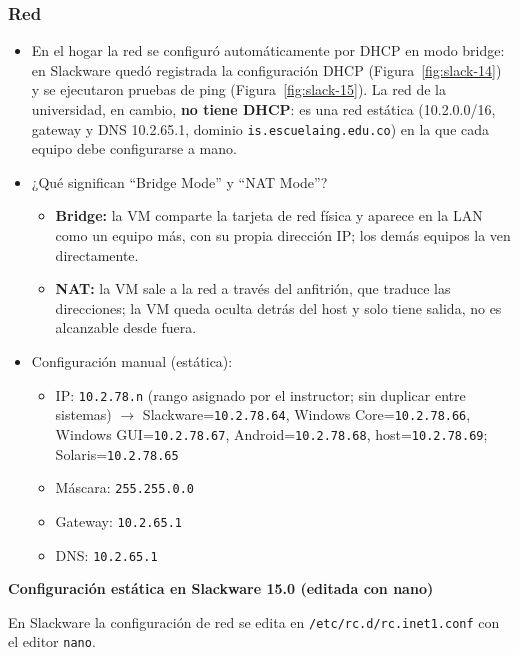 \documentclass[11pt,a4paper]{report}
\begin{document}
\subsubsection{Red}

\begin{itemize}
  \item En el hogar la red se configuró automáticamente por DHCP en modo bridge: en Slackware quedó registrada la configuración DHCP (Figura~\ref{fig:slack-14}) y se ejecutaron pruebas de ping (Figura~\ref{fig:slack-15}). La red de la universidad, en cambio, \textbf{no tiene DHCP}: es una red estática (10.2.0.0/16, gateway y DNS 10.2.65.1, dominio \texttt{is.escuelaing.edu.co}) en la que cada equipo debe configurarse a mano.
  \item ¿Qué significan ``Bridge Mode'' y ``NAT Mode''?
    \begin{itemize}
      \item \textbf{Bridge:} la VM comparte la tarjeta de red física y aparece en la LAN como un equipo más, con su propia dirección IP; los demás equipos la ven directamente.
      \item \textbf{NAT:} la VM sale a la red a través del anfitrión, que traduce las direcciones; la VM queda oculta detrás del host y solo tiene salida, no es alcanzable desde fuera.
    \end{itemize}
  \item Configuración manual (estática):
    \begin{itemize}
      \item IP: \texttt{10.2.78.n} (rango asignado por el instructor; sin duplicar entre sistemas) $\rightarrow$ Slackware=\texttt{10.2.78.64}, Windows Core=\texttt{10.2.78.66}, Windows GUI=\texttt{10.2.78.67}, Android=\texttt{10.2.78.68}, host=\texttt{10.2.78.69}; Solaris=\texttt{10.2.78.65}
      \item Máscara: \texttt{255.255.0.0}
      \item Gateway: \texttt{10.2.65.1}
      \item DNS: \texttt{10.2.65.1}
    \end{itemize}
\end{itemize}

\textbf{Configuración estática en Slackware 15.0 (editada con nano)}

En Slackware la configuración de red se edita en \texttt{/etc/rc.d/rc.inet1.conf} con el editor \texttt{nano}.
\end{document}
